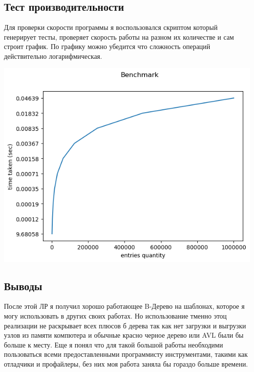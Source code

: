 \documentclass[12pt]{article}
\begin{document}
\subsection*{Тест производительности}
Для проверки скорости программы я воспользовался скриптом который генерирует тесты, проверяет скорость работы на разном их 
количестве и сам строит график. По графику можно убедится что сложность операций действительно логарифмическая.

\includegraphics[width=\linewidth]{benchmark}

\subsection*{Выводы}

После этой ЛР я получил хорошо работающее B-Дерево на шаблонах, которое я могу использовать в других своих работах. Но использование тменно этоц реализации не раскрывает всех плюсов б дерева так как нет загрузки и выгрузки узлов из памяти компютера и обычные красно черное дерево или AVL  были бы больше к месту. Еще я понял что для такой большой работы необходими пользоваться всеми предоставленными программисту инструментами, такими как отладчики и профайлеры, без них моя работа заняла бы гораздо больше времени.
\end{document}
